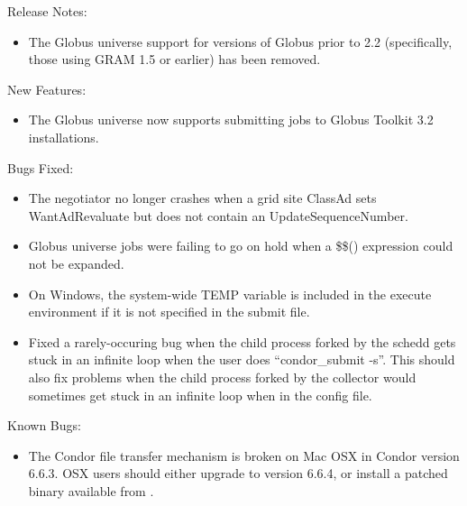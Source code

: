 \noindent Release Notes:

\begin{itemize}

\item The Globus universe support for versions of Globus prior to 2.2 (specifically, those using GRAM 1.5 or earlier) has been removed.

\end{itemize}


\noindent New Features:

\begin{itemize}

\item The Globus universe now supports submitting jobs to Globus Toolkit 3.2 installations.

\end{itemize}

\noindent Bugs Fixed:

\begin{itemize}

\item The negotiator no longer crashes when a grid site ClassAd sets WantAdRevaluate but does not contain an UpdateSequenceNumber.

\item Globus universe jobs were failing to go on hold when a \$\$() expression
could not be expanded.

\item On Windows, the system-wide TEMP variable is included in the
execute environment if it is not specified in the submit file.

\item Fixed a rarely-occuring bug when  the child process forked by the schedd gets stuck in an infinite loop when the user does ``condor\_submit -s''. This should also fix problems when the child process forked by the collector would sometimes get stuck in an infinite loop when  in the config file.

\end{itemize}

\noindent Known Bugs:

\begin{itemize}

\item The Condor file transfer mechanism is broken on Mac OSX in
  Condor version 6.6.3.
  OSX users should either upgrade to version 6.6.4, or install a
  patched  binary available from
  . 

\end{itemize}






